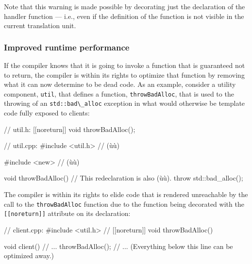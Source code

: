 \noindent Note that this warning is made possible by decorating just the
declaration of the handler function --- i.e., even if the definition of
the function is not visible in the current translation unit.

\subsubsection[Improved runtime performance]{Improved runtime performance}\label{improved-runtime-performance}

If the compiler knows that it is going to invoke a function
that is guaranteed not to return, the compiler is within its rights to optimize
that function by removing what it can now determine to be dead code. As
an example, consider a utility component, \lstinline!util!, that defines a
function, \lstinline!throwBadAlloc!, that is used to  the
throwing of an \lstinline!std::bad\_alloc! exception in what would
otherwise be template code fully exposed to clients:

%
%
\begin{emcppslisting}[emcppsbatch=e4]
// util.h:
[[noreturn]] void throwBadAlloc();

// util.cpp:
#include <util.h>  // (ù{}ù)

#include <new>    // (ù{}ù)

void throwBadAlloc()  // This redeclaration is also (ù{\codeincomments{[[noreturn]]}}ù).
{
    throw std::bad_alloc();
}
\end{emcppslisting}


\noindent The compiler is within its
rights to elide code that is rendered unreachable by the call to the
\lstinline!throwBadAlloc! function due to the function being decorated with the
\lstinline![[noreturn]]! attribute on its declaration:

\begin{emcppslisting}[emcppsbatch=e4]
// client.cpp:
#include <util.h>  // [[noreturn]] void throwBadAlloc()

void client()
{
    // ...
    throwBadAlloc();
    // ... (Everything below this line can be optimized away.)
}
\end{emcppslisting}


